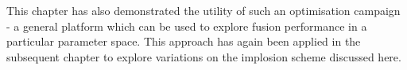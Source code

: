 This chapter has also demonstrated the utility of such an optimisation campaign - a general platform which can be used to explore fusion performance in a particular parameter space. This approach has again been applied in the subsequent chapter to explore variations on the implosion scheme discussed here.






















